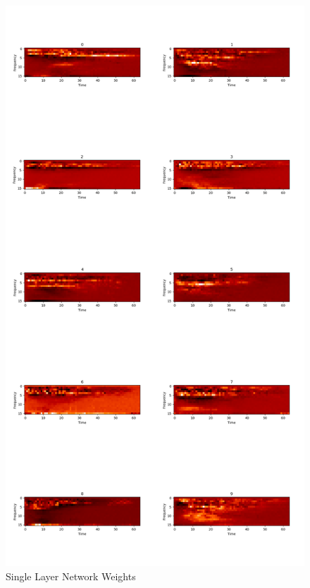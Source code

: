 \documentclass[10pt,a4paper]{report}
\begin{document}
\begin{figure}[H]
\centering
\includegraphics[scale=0.12]{nn_spec.png}
\caption{Single Layer Network Weights}
\label{fig:nn_spect}
\end{figure}
\newpage
\end{document}
